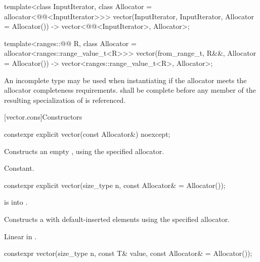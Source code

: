 \begin{codeblock}
{  template<class InputIterator, class Allocator = allocator<@@<InputIterator>>>
    vector(InputIterator, InputIterator, Allocator = Allocator())
      -> vector<@@<InputIterator>, Allocator>;

  template<ranges::@@ R, class Allocator = allocator<ranges::range_value_t<R>>>
    vector(from_range_t, R&&, Allocator = Allocator())
      -> vector<ranges::range_value_t<R>, Allocator>;
}
\end{codeblock}%
%

\pnum
An incomplete type  may be used when instantiating 
if the allocator meets the
allocator completeness requirements.
 shall be complete before any member of the resulting specialization
of  is referenced.

[vector.cons]{Constructors}

\begin{itemdecl}
constexpr explicit vector(const Allocator&) noexcept;
\end{itemdecl}

\begin{itemdescr}
\pnum
\effects
Constructs an empty , using the
specified allocator.

\pnum
\complexity
Constant.
\end{itemdescr}

\begin{itemdecl}
constexpr explicit vector(size_type n, const Allocator& = Allocator());
\end{itemdecl}

\begin{itemdescr}
\pnum
\expects
{} is  into .

\pnum
\effects
Constructs a  with 
default-inserted elements using the specified allocator.

\pnum
\complexity
Linear in .
\end{itemdescr}

\begin{itemdecl}
constexpr vector(size_type n, const T& value,
                 const Allocator& = Allocator());
\end{itemdecl}

